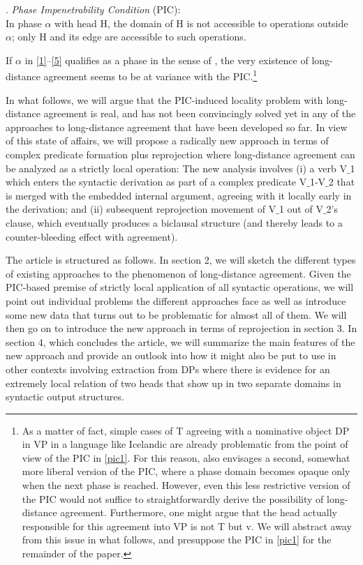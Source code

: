 \documentclass[output=paper
,modfonts
,nonflat]{langsci/langscibook}
\begin{document}
\Lsciex. {\it Phase Impenetrability Condition} \label{pic1}(PIC):\\
  In phase $\alpha$ with head H, the domain of H is not accessible to
  operations outside $\alpha$; only H and its edge are accessible to such
  operations.

If $\alpha$ in \ref{1}--\ref{5} qualifies as a phase in the sense of
\Last, the very existence of long-distance agreement seems to be at
variance with the PIC.\footnote{\label{fn1}As a matter of fact, simple cases of T
  agreeing with a nominative object DP in VP in a language like
  Icelandic are already problematic from the point of view of the PIC
  in \ref{pic1}. For this reason, \cite{Chomsky:01} also envisages a
  second, somewhat more liberal version of the PIC, where a phase
  domain becomes opaque only when the next phase is reached. However, even
  this less restrictive version of the PIC would not suffice to
  straightforwardly derive the possibility of long-distance
  agreement. Furthermore, one might argue that the head actually
  responsible for this agreement into VP is not T but v. We will
  abstract away from this issue in what follows, and presuppose the
  PIC in \ref{pic1} for the remainder of the paper.}

In what follows, we will argue that the PIC-induced locality problem
with long-distance agreement is real, and has not been
convincingly solved yet in any of the approaches to long-distance
agreement that have been developed so far. In view of this state of
affairs, we will propose a radically new approach in terms of complex
predicate formation plus reprojection where long-distance agreement
can be analyzed as a strictly local operation: The new analysis  involves (i) a verb
V$\_$1 which enters the syntactic derivation as part of a complex
predicate V$\_$1-V$\_$2 that is merged with the embedded internal argument,
agreeing with it locally early in the derivation; and (ii) subsequent
reprojection movement of V$\_$1 out of V$\_$2's clause, which eventually
produces a biclausal structure (and thereby leads to a
counter-bleeding effect with agreement). 

The article is structured as follows. In section 2, we will sketch the
different types of existing approaches to the phenomenon of
long-distance agreement. Given the PIC-based premise of strictly local
application of all syntactic operations, we will point out individual
problems the different approaches face as well as introduce some new
data that turns out to be problematic for almost all of them. We will
then go on to introduce the new approach in terms of reprojection in
section 3. In section 4, which concludes the article, we will
summarize the main features of the new approach and provide an outlook
into how it might also be put to use in other contexts involving
extraction from DPs where there is evidence for an extremely local
relation of two heads that show up in two separate domains in
syntactic output structures.
  
\end{document}
